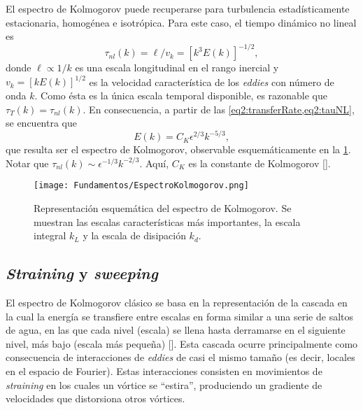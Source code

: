 El espectro de Kolmogorov puede recuperarse para turbulencia
estadísticamente estacionaria, homogénea e isotrópica. Para este caso,
el tiempo dinámico no lineal es
\begin{equation}\label{eq2:tauNL}
  \tau_{nl}(k) = \ell/v_k = [k^3 E(k)]^{-1/2},
\end{equation}
donde $\ell\propto 1/k$ es una escala longitudinal en el rango
inercial y $v_k = [k E(k)]^{1/2}$ es la velocidad característica de
los \textit{eddies} con número de onda $k$. Como ésta es la única
escala temporal disponible, es razonable que $\tau_T(k) =
\tau_{nl}(k)$. En consecuencia, a partir de las
\cref{eq2:transferRate,eq2:tauNL}, se encuentra que
\begin{equation}\label{eq2:Ek}
  E(k) = C_K \epsilon^{2/3} k^{-5/3},
\end{equation}
que resulta ser el espectro de Kolmogorov, observable esquemáticamente
en la \cref{fig:FundEspectroKolmogorov}. Notar que $\tau_{nl}(k) \sim
\epsilon^{-1/3} k^{-2/3}$. Aquí, $C_K$ es la constante de Kolmogorov
[\cite{sreenivasan_universality_1995, yeung_universality_1997}].
\begin{figure}[h]
  \centering
  \texttt{[image: Fundamentos/EspectroKolmogorov.png]}
  \caption{Representación esquemática del espectro de Kolmogorov. Se
    muestran las escalas características más importantes, la escala
    integral $k_L$ y la escala de disipación $k_d$.}
  \label{fig:FundEspectroKolmogorov}
\end{figure}


\subsection{\textit{Straining} y \textit{sweeping}}

El espectro de Kolmogorov clásico se basa en la representación de la
cascada en la cual la energía se transfiere entre escalas en forma
similar a una serie de saltos de agua, en las que cada nivel (escala)
se llena hasta derramarse en el siguiente nivel, más bajo (escala más
pequeña) [\cite{tennekes_first_1972}]. Esta cascada ocurre
principalmente como consecuencia de interacciones de \textit{eddies}
de casi el mismo tamaño (es decir, locales en el espacio de
Fourier). Estas interacciones consisten en movimientos de
\textit{straining} en los cuales un vórtice se ``estira'', produciendo
un gradiente de velocidades que distorsiona otros vórtices.


